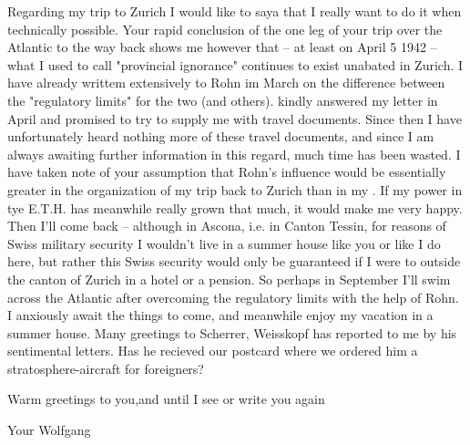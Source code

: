 Regarding my trip to Zurich I would like to saya that I really want to do it when technically possible. Your rapid conclusion of the one leg of your trip over the Atlantic to the way back shows me however that -- at least on April 5 1942 -- what I used to call "provincial ignorance" continues to exist unabated in Zurich. I have already writtem extensively to Rohn im March on the difference between the "regulatory limits" for the two  (and others).  kindly answered my letter in April and promised to try to supply me with travel documents. Since then I have unfortunately heard nothing more of these travel documents, and since I am always awaiting further information in this regard, much time has been wasted. I have taken note of your assumption that Rohn's influence would be essentially greater in the organization of my trip back to Zurich than in my . If my power in tye E.T.H. has meanwhile really grown that much, it would make me very happy. Then I'll come back -- although in Ascona, i.e. in Canton Tessin, for reasons of Swiss military security I wouldn't live in a summer house like you or like I do here, but rather this Swiss security would only be guaranteed if I were to  outside the canton of Zurich in a hotel or a pension. So perhaps in September I'll swim across the Atlantic after overcoming the regulatory limits with the help of Rohn. I anxiously await the things to come, and meanwhile enjoy my vacation in a summer house. Many greetings to Scherrer, Weisskopf has reported to me by his sentimental letters. Has he recieved our postcard where we ordered him a stratosphere-aircraft for foreigners?

Warm greetings to you,and until I see or write you again

Your Wolfgang


